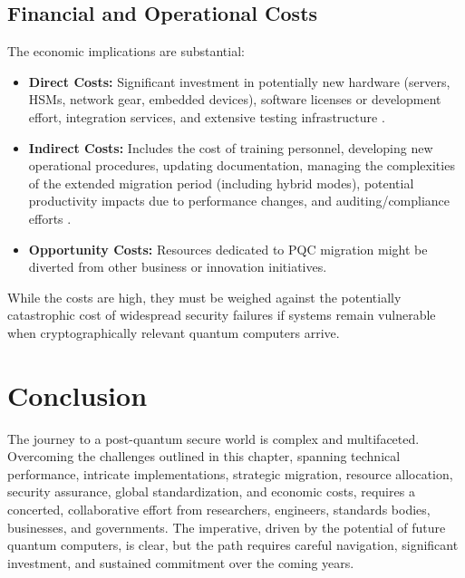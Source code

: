\subsection{Financial and Operational Costs}\label{subsec:financial_ch7_rev}
The economic implications are substantial:
\begin{itemize}
    \item \textbf{Direct Costs:} Significant investment in potentially new hardware (servers, HSMs, network gear, embedded devices), software licenses or development effort, integration services, and extensive testing infrastructure \parencite{pqc_economic_impact_finance}.
    \item \textbf{Indirect Costs:} Includes the cost of training personnel, developing new operational procedures, updating documentation, managing the complexities of the extended migration period (including hybrid modes), potential productivity impacts due to performance changes, and auditing/compliance efforts \parencite{pqc_economic_impact_healthcare}.
    \item \textbf{Opportunity Costs:} Resources dedicated to PQC migration might be diverted from other business or innovation initiatives.
\end{itemize}
While the costs are high, they must be weighed against the potentially catastrophic cost of widespread security failures if systems remain vulnerable when cryptographically relevant quantum computers arrive.

\section{Conclusion}
The journey to a post-quantum secure world is complex and multifaceted. Overcoming the challenges outlined in this chapter, spanning technical performance, intricate implementations, strategic migration, resource allocation, security assurance, global standardization, and economic costs, requires a concerted, collaborative effort from researchers, engineers, standards bodies, businesses, and governments. The imperative, driven by the potential of future quantum computers, is clear, but the path requires careful navigation, significant investment, and sustained commitment over the coming years.

